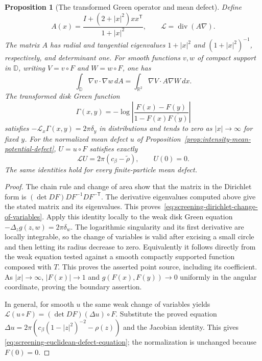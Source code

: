 \documentclass[11pt,a4paper]{article}
\numberwithin{equation}{section}
\newtheorem{proposition}[theorem]{Proposition}
\theoremstyle{definition}
\theoremstyle{remark}
\newcommand{\D}{\mathbb D}
\begin{document}
\begin{proposition}[The transformed Green operator and mean defect]
\label{prop:screening-euclidean-elliptic-operator}
Define
\[
 A(x)=\frac{I+(2+|x|^2)xx^{\mathsf T}}{1+|x|^2},\qquad
 \mathcal L=\operatorname{div}(A\nabla).
\]
The matrix $A$ has radial and tangential eigenvalues $1+|x|^2$
and $(1+|x|^2)^{-1}$, respectively, and determinant one.  For
smooth functions $v,w$ of compact support in $\D$, writing
$V=v\circ F$ and $W=w\circ F$, one has
\begin{equation}
 \int_\D\nabla v\cdot\nabla w\,dA
       =\int_{\mathbb R^2}\nabla V\cdot A\nabla W\,dx.
 \label{eq:screening-dirichlet-change-of-variables}
\end{equation}
The transformed disk Green function
\[
 \Gamma(x,y)=-\log\left|
       \frac{F(x)-F(y)}{1-F(x)\overline{F(y)}}\right|
\]
satisfies $-\mathcal L_x\Gamma(x,y)=2\pi\delta_y$ in
distributions and tends to zero as $|x|\to\infty$ for fixed $y$.
For the normalized mean defect $u$ of
Proposition~\ref{prop:intensity-mean-potential-defect},
$U=u\circ F$ satisfies exactly
\begin{equation}
 \mathcal LU=2\pi(c_\beta-\widetilde\rho),\qquad U(0)=0.
 \label{eq:screening-euclidean-defect-equation}
\end{equation}
The same identities hold for every finite-particle mean defect.
\end{proposition}

\begin{proof}
The chain rule and change of area show that the matrix in the
Dirichlet form is
$(\det DF)DF^{-1}DF^{-\mathsf T}$.  The derivative eigenvalues
computed above give the stated matrix and its eigenvalues.  This
proves~\eqref{eq:screening-dirichlet-change-of-variables}.
Apply this identity locally to the weak disk Green equation
$-\Delta_z g(z,w)=2\pi\delta_w$.  The logarithmic singularity
and its first derivative are locally integrable, so the change of
variables is valid after excising a small circle and then letting its
radius decrease to zero.  Equivalently it follows directly from the
weak equation tested against a smooth compactly supported function
composed with $T$.  This proves the asserted point source, including
its coefficient.  As $|x|\to\infty$, $|F(x)|\to1$ and
$g(F(x),F(y))\to0$ uniformly in the angular coordinate, proving
the boundary assertion.

In general, for smooth $u$ the same weak change of variables yields
$\mathcal L(u\circ F)=(\det DF)(\Delta u)\circ F$.
Substitute the proved equation
$\Delta u=2\pi(c_\beta(1-|z|^2)^{-2}-\rho(z))$ and the
Jacobian identity.  This gives
\eqref{eq:screening-euclidean-defect-equation}; the normalization
is unchanged because $F(0)=0$.
\end{proof}
\end{document}
